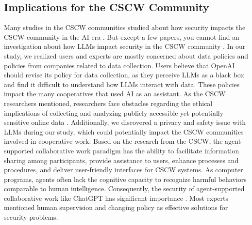 \documentclass[sigconf]{acmart}
\begin{document}
\subsection{Implications for the CSCW Community}


Many studies in the CSCW communities studied about how security impacts the CSCW community in the AI era \cite{yi2003privacy, 10.1145/3500868.3559706, 10.1145/3462204.3481724, 10.1145/2998181.2998191, 10.1145/2675133.2675225}. But except a few papers, you cannot find an investigation about how LLMs impact security in the CSCW community \cite{yi2003privacy}. In our study, we realized users and experts are mostly concerned about data policies and policies from companies related to data collection. Users believe that OpenAI should revise its policy for data collection, as they perceive LLMs as a black box and find it difficult to understand how LLMs interact with data. These policies impact the many cooperatives that used AI as an assistant. As the CSCW researchers mentioned, researchers face obstacles regarding the ethical implications of collecting and analyzing publicly accessible yet potentially sensitive online data \cite{vitak2016beyond}. Additionally, we discovered a privacy and safety issue with LLMs during our study, which could potentially impact the CSCW communities involved in cooperative work. Based on the research from the CSCW, the agent-supported collaborative work paradigm has the ability to facilitate information sharing among participants, provide assistance to users, enhance processes and procedures, and deliver user-friendly interfaces for CSCW systems. As computer programs, agents often lack the cognitive capacity to recognize harmful behaviors comparable to human intelligence. Consequently, the security of agent-supported collaborative work like ChatGPT has significant importance \cite{yi2003privacy}. Most experts mentioned human supervision and changing policy as effective solutions for security problems.
\end{document}
